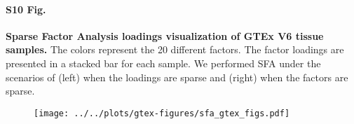 \documentclass[10pt,letterpaper]{article}
\begin{document}
\paragraph*{S10 Fig.}

\label{figS10}
{\bf Sparse Factor Analysis loadings visualization of GTEx V6 tissue samples.} The colors represent the 20 different factors. The factor loadings are presented in a stacked bar for each sample. We performed SFA under the scenarios of (left) when the loadings are sparse and (right) when the factors are sparse.
\begin{figure}[ht]
\centering
\texttt{[image: ../../plots/gtex-figures/sfa\_gtex\_figs.pdf]}
\end{figure}
\end{document}

